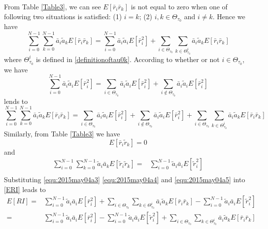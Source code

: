  From Table \ref{Table3}, we can see $E[\bar{r}_i\bar{r}_k]$ is not equal to zero when one of following two situations is satisfied: (1) $i = k$; (2) $i, k \in \Theta_{\tau_0}$ and $i \neq k$. Hence we have 
 \[
\sum_{i=0}^{N-1}\sum_{k=0}^{N-1}\bar{a}_i\tilde{a}_kE[\bar{r}_i\bar{r}_k] = 
\sum_{i=0}^{N-1}\bar{a}_i\tilde{a}_iE[\bar{r}_i^2] + \sum_{i\in\Theta_{\tau_0}}\sum_{k\in\Theta_{\tau_0}^i}\bar{a}_i\tilde{a}_kE[\bar{r}_i\bar{r}_k]
 \]
 where $\Theta_{\tau_0}^i$ is defined in \eqref{definitionoftau0k}. 
 According to whether or not $i \in \Theta_{\tau_0}$, we have  
 \[
   \sum_{i=0}^{N-1}\bar{a}_i\tilde{a}_iE[\bar{r}_i^2]=
   \sum_{i\in\Theta_{\tau_0}}\bar{a}_i\tilde{a}_iE[\bar{r}_i^2] + \sum_{i\notin\Theta_{\tau_0}}\bar{a}_i\tilde{a}_iE[\bar{r}_i^2]
 \]
lends to 
\begin{equation}
\sum_{i=0}^{N-1}\sum_{k=0}^{N-1}\bar{a}_i\tilde{a}_kE[\bar{r}_i\bar{r}_k] = 
   \sum_{i\in\Theta_{\tau_0}}\bar{a}_i\tilde{a}_iE[\bar{r}_i^2] + \sum_{i\notin\Theta_{\tau_0}}\bar{a}_i\tilde{a}_iE[\bar{r}_i^2]
+ \sum_{i\in\Theta_{\tau_0}}\sum_{k\in\Theta_{\tau_0}^i}\bar{a}_i\tilde{a}_kE[\bar{r}_i\bar{r}_k]
  \label{equ:2015may04a3}
\end{equation}
Similarly, from Table \ref{Table3} we have
 \begin{equation}
   E[\bar{r}_i\tilde{r}_k]= 0 
   \label{equ:2015may04a4}
 \end{equation}
and
\begin{equation}
  \begin{split}
    \sum_{i=0}^{N-1}\sum_{k=0}^{N-1}\tilde{a}_i\bar{a}_kE[\tilde{r}_i\tilde{r}_k]  =&  \sum_{i=0}^{N-1}\tilde{a}_i\bar{a}_iE[\tilde{r}_i^2]\\
  \end{split}
  \label{equ:2015may04a5}
\end{equation}
Substituting \eqref{equ:2015may04a3} \eqref{equ:2015may04a4} and \eqref{equ:2015may04a5} into \eqref{ERI} leads to  
 \begin{equation}
   \begin{split}
     E[RI] = &\sum_{i=0}^{N-1}\tilde{a}_i\bar{a}_iE[\bar{r}_i^2]  + \sum_{i\in\Theta_{\tau_0}}\sum_{k\in\Theta_{\tau_0}^i}\bar{a}_i\tilde{a}_kE[\bar{r}_i\bar{r}_k] - \sum_{i=0}^{N-1}\tilde{a}_i\bar{a}_iE[\tilde{r}_i^2]\\
     = &\sum_{i=0}^{N-1}\tilde{a}_i\bar{a}_iE[\bar{r}_i^2] - \sum_{i=0}^{N-1}\tilde{a}_i\bar{a}_iE[\tilde{r}_i^2] + \sum_{i\in\Theta_{\tau_0}}\sum_{k\in\Theta_{\tau_0}^i}\bar{a}_i\tilde{a}_kE[\bar{r}_i\bar{r}_k]
    \label{2015apr27a1}
   \end{split}
 \end{equation}
